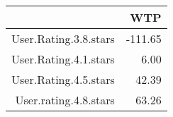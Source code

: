 \begin{table}[ht]
\centering
\begin{tabular}{rr}
  \hline
 & WTP \\ 
  \hline
User.Rating.3.8.stars & -111.65 \\ 
  User.Rating.4.1.stars & 6.00 \\ 
  User.Rating.4.5.stars & 42.39 \\ 
  User.rating.4.8.stars & 63.26 \\ 
   \hline
\end{tabular}
\end{table}
